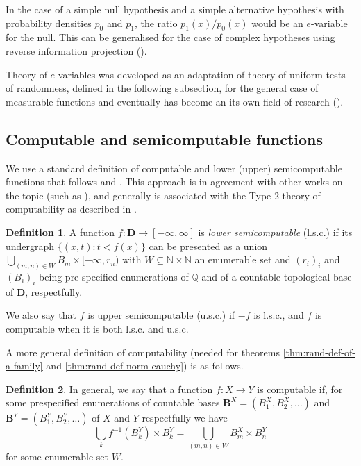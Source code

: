 \documentclass{article}
\theoremstyle{definition}
\theoremstyle{definition}
\newtheorem{definition}{Definition}[section]
\newcommand{\natnums}{\mathbb{N}}
\newcommand{\ratnums}{\mathbb{Q}}
\newcommand{\adomain}{\mathbf{D}}
\begin{document}
In the case of a simple null hypothesis and a simple alternative hypothesis with probability densities $p_0$ and $p_1$, the ratio $p_1(x)/p_0(x)$ would be an $e$-variable for the null. This can be generalised for the case of complex hypotheses using reverse information projection (\cite{LardyReverseInfProj, GrunwaldSafeTesting}).

Theory of $e$-variables was developed as an adaptation of theory of uniform tests of randomness, defined in the following subsection, for the general case of measurable functions and eventually has become an its own field of research (\cite{vovk2020nonalgorithmic, RamdasWang2025}).

\subsection{Computable and semicomputable functions}

We use a standard definition of computable and lower (upper) semicomputable functions that follows \cite{GACS200591} and \cite{Bienvenu2011AlgorithmicTA}. This approach is in agreement with other works on the topic (such as \cite{VovkVyuginBayes}), and generally is associated with the Type-2 theory of computability as described in \cite{weihrauch2000computable}.

\begin{definition}\label{dfn:lsc-fun}
    A function $f : \adomain \to [-\infty,\infty]$ is \emph{lower semicomputable} (l.s.c.) if its undergraph $\{(x,t) : t < f(x) \}$ can be presented as a union $\bigcup_{(m,n)\in W} B_m \times [-\infty,r_n)$ with $W \subseteq \natnums\times\natnums$ an enumerable set and $(r_i)_i$ and $(B_i)_i$ being pre-specified enumerations of $\ratnums$ and of a countable topological base of $\adomain$, respectfully.

    We also say that $f$ is upper semicomputable (u.s.c.) if $-f$ is l.s.c., and $f$ is computable when it is both l.s.c. and u.s.c.
\end{definition}

A more general definition of computability (needed for theorems \ref{thm:rand-def-of-a-family} and \ref{thm:rand-def-norm-cauchy}) is as follows.

\begin{definition}
    In general, we say that a function $f: X \to Y$ is computable if, for some prespecified enumerations of countable bases $\mathbf{B}^X=\left(B_1^X,B_2^X,\ldots\right)$ and $\mathbf{B}^Y=\left(B_1^Y,B_2^Y,\ldots\right)$ of $X$ and $Y$ respectfully we have
\[
    \bigcup_{k} f^{-1}\left(B_k^Y\right) \times B_k^Y = \bigcup_{(m,n)\in W} B_m^X \times B_n^Y
\]
for some enumerable set $W$.
\end{definition}
\end{document}
